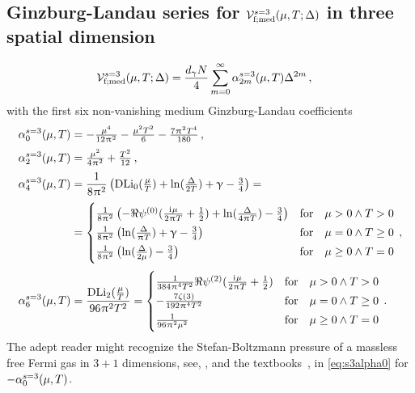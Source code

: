 \subsection{Ginzburg-Landau series \texorpdfstring{for $\mathcal{V}_{\mathrm{f};\med}^{s=3}(\muT;\Delta)$}{} in three spatial dimension}\label{app:Vmedf3Series}
\begin{align}
	\VeffArgs[\mathrm{f};\med][s=3]{\muT;\Delta} &= \frac{d_\gamma N}{4}\sum_{m=0}^\infty \alpha_{2m}^{s=3}(\muT)\Delta^{2m}\, ,
\end{align}
with the first six non-vanishing medium Ginzburg-Landau coefficients
\begin{align}
	\alpha_0^{s=3}(\muT) &= -\tfrac{\mu ^4}{12 \piu ^2}-\tfrac{\mu ^2 T^2}{6}-\tfrac{7 \piu ^2 T^4}{180} \, ,\label{eq:s3alpha0} \\[.25em]
	\alpha_2^{s=3}(\muT) &= \tfrac{\mu ^2}{4 \piu ^2}+\tfrac{T^2}{12}\, ,\label{eq:s3alpha2} \\[.25em]
	\alpha_4^{s=3}(\muT) &= \frac{1}{8 \piu^2}\del[1]{\DLi_{0}(\tfrac{\mu}{T}) +\ln (\tfrac{\Delta }{2  T}) +\emc-\tfrac{3}{4} } = \notag \\[.25em]
	&=\begin{cases}
		\frac{1}{8 \piu ^2}\del[1]{-\Re\MFpsi^{(0)}(\tfrac{\iu \mu }{2 \piu  T}+\tfrac{1}{2})+\ln (\tfrac{\Delta }{4 \piu  T})-\tfrac{3}{4}} &\text{for}\quad \mu>0\land T>0 \\[.25em]
		\frac{1}{8 \piu ^2}\del[1]{\ln (\tfrac{\Delta }{\piu  T})+\emc -\tfrac{3}{4}} &\text{for}\quad \mu=0\land T\geq 0 \\[.25em]
		\frac{1}{8 \piu ^2}\del[1]{\ln (\tfrac{\Delta }{2 \mu })-\tfrac{3}{4}} &\text{for}\quad  \mu\geq 0\land T=0
	\end{cases}\, ,\label{eq:s3alpha4}\\[.25em]
	\alpha_6^{s=3}(\muT) &= \frac{\DLi_{2}(\tfrac{\mu}{T})}{96\piu^2T^2} = 
	\begin{cases}
		\frac{1}{384 \piu ^4 T^2}\Re\MFpsi^{(2)}(\tfrac{\iu \mu }{2 \piu  T}+\tfrac{1}{2}) &\text{for}\quad \mu>0\land T>0 \\[.25em]
		-\frac{7 \zeta (3)}{192 \piu ^4 T^2} &\text{for}\quad \mu=0\land T\geq 0 \\[.25em]
		\frac{1}{96 \piu ^2 \mu ^2} &\text{for}\quad  \mu\geq 0\land T=0
	\end{cases}\, .\label{eq:s3alpha6} 
\end{align}
The adept reader might recognize the Stefan-Boltzmann pressure of a massless free Fermi gas in $3 + 1$ dimensions, see, \eg{},  and the textbooks~\cite{Kleinert:2016,Kapusta:2006pm}, in \cref{eq:s3alpha0} for $- \alpha_0^{s=3}(\muT)$.


